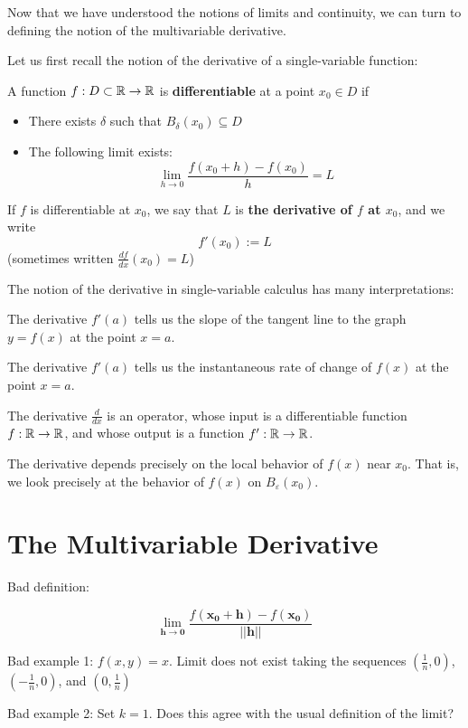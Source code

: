 Now that we have understood the notions of limits and continuity, we can turn to defining the notion of the multivariable derivative.

Let us first recall the notion of the derivative of a single-variable function:


\begin{definition}
    A function $f : D \subset \mathbb{R} \to \mathbb{R}$ is \textbf{differentiable} at a point $x_0 \in D$ if 

    \begin{itemize}
        \item There exists $\delta$ such that $B_\delta(x_0) \subseteq D$
        \item The following limit exists:  $$\lim_{h \to 0} \frac{f(x_0+h) - f(x_0)}{h} = L$$
    \end{itemize}

    If $f$ is differentiable at $x_0$, we say that $L$ is \textbf{the derivative of $f$ at $x_0$}, and we write $$f'(x_0) := L$$
    (sometimes written $\frac{df}{dx}(x_0) = L$)
    \end{definition}

The notion of the derivative in single-variable calculus has many interpretations:

The derivative $f'(a)$ tells us the slope of the tangent line to the graph $y=f(x)$ at the point $x=a$.

The derivative $f'(a)$ tells us the instantaneous rate of change of $f(x)$ at the point $x=a$.

The derivative $\frac{d}{dx}$ is an operator, whose input is a differentiable function $f : \mathbb{R} \to \mathbb{R}$, and whose output is a function $f' : \mathbb{R} \to \mathbb{R}$.


The derivative depends precisely on the local behavior of $f(x)$ near $x_0$.  That is, we look precisely at the behavior of $f(x)$ on $B_\varepsilon(x_0)$.

\section{The Multivariable Derivative}

Bad definition: 

$$\lim_{\bm{h} \to \bm{0}} \frac{f(\bm{x_0+h})-f(\bm{x_0})}{||\bm{h}||}$$

Bad example 1: $f(x,y) = x$.  Limit does not exist taking the sequences $(\frac{1}{n}, 0)$, $(-\frac{1}{n}, 0)$, and $(0, \frac{1}{n})$

Bad example 2: Set $k=1$.  Does this agree with the usual definition of the limit?

